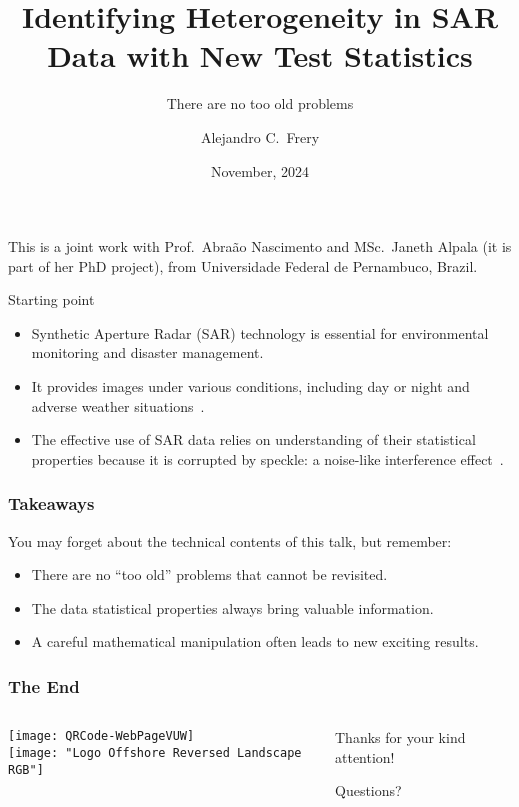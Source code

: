 \documentclass[table,aspectratio=169]{beamer}
\title{Identifying Heterogeneity in SAR Data with New Test Statistics}
\subtitle{There are no too old problems}
\author{Alejandro C.\ Frery}
\institute{Victoria University of Wellington\\
	School of Mathematics and Statistics\\
	New Zealand}
\date{November, 2024}
\begin{document}
	
	\setsansfont[BoldFont={Avenir Heavy}]{Avenir Book}
	
	\frame{\titlepage}
	
	\begin{frame}
		This is a joint work with Prof.\ Abraão Nascimento and MSc.\ Janeth Alpala (it is part of her PhD project), from Universidade Federal de Pernambuco, Brazil.
	\end{frame}
	
	\begin{frame}{Starting point}
		\begin{itemize}[<+->]
			\item Synthetic Aperture Radar (SAR) technology is essential for environmental monitoring and disaster management. 
			\item It provides
			images under various conditions, including day or night and adverse weather
			situations~\citep{Moreira2013,Mu2019}. 
			\item The effective use of SAR
			data relies on understanding of their statistical properties
			because it is corrupted by speckle: a noise-like interference effect~\citep{Argenti2013}.
		\end{itemize}
	\end{frame}
	
	\begin{frame}[standout]
		\frametitle{Takeaways}
		You may forget about the technical contents of this talk, but remember:
		\begin{itemize}[<+->]
			\item There are no ``too old'' problems that cannot be revisited.
			\item The data statistical properties always bring valuable information.
			\item A careful mathematical manipulation often leads to new exciting results.
		\end{itemize}
	\end{frame}
	
	
	\begin{frame}
		
		 	
	\end{frame}
	
	\begin{frame}[standout]
		\frametitle{The End}
		\begin{columns}
			\begin{column}{.4\linewidth}
				\centering
				\texttt{[image: QRCode-WebPageVUW]}\\	\texttt{[image: "Logo Offshore Reversed Landscape RGB"]}
			\end{column}
			\begin{column}{.6\linewidth}
				Thanks for your kind attention!
				
				Questions?
			\end{column}
		\end{columns}
		
	\end{frame}
	
\end{document}
